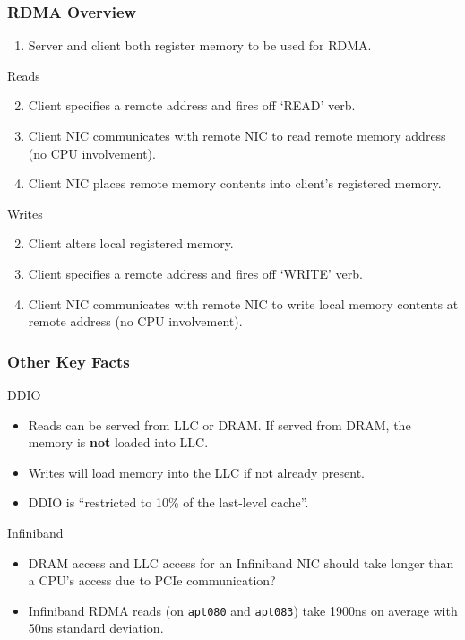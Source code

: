 \documentclass{beamer}
\begin{document}
\begin{frame}
 \frametitle{RDMA Overview}

 \begin{enumerate}
  \item Server and client both register memory to be used for RDMA.
 \end{enumerate}

 \begin{block}{Reads}
  \begin{enumerate}
   \setcounter{enumi}{1}
   \item Client specifies a remote address and fires off `READ' verb.
   \item Client NIC communicates with remote NIC to read remote memory address (no CPU involvement).
   \item Client NIC places remote memory contents into client's registered memory.
  \end{enumerate}
 \end{block}

 \begin{block}{Writes}
  \begin{enumerate}
   \setcounter{enumi}{1}
   \item Client alters local registered memory.
   \item Client specifies a remote address and fires off `WRITE' verb.
   \item Client NIC communicates with remote NIC to write local memory contents at remote address (no CPU involvement).
  \end{enumerate}
 \end{block}

\end{frame}

\begin{frame}
 \frametitle{Other Key Facts}

 \begin{block}{DDIO}
  \begin{itemize}
   \item Reads can be served from LLC or DRAM. If served from DRAM, the memory is \textbf{not} loaded into LLC.
   \item Writes will load memory into the LLC if not already present.
   \item DDIO is ``restricted to 10\% of the last-level cache''.
  \end{itemize}
 \end{block}

 \begin{block}{Infiniband}
  \begin{itemize}
   \item DRAM access and LLC access for an Infiniband NIC should take longer than a CPU's access due to PCIe communication?
   \item Infiniband RDMA reads (on \texttt{apt080} and \texttt{apt083}) take 1900ns on average with 50ns standard deviation.
  \end{itemize}
 \end{block}
\end{frame}
\end{document}
